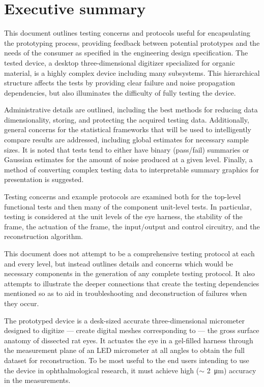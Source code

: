\documentclass{article}
\begin{document}

\setcounter{tocdepth}{3}
\tableofcontents
\newpage

\section*{Executive summary}
\label{sec:exec-summary}

This document outlines testing concerns and protocols useful for encapsulating the prototyping process, providing feedback between potential prototypes and the needs of the consumer as specified in the engineering design specification. The tested device, a desktop three-dimensional digitizer specialized for organic material, is a highly complex device including many subsystems. This hierarchical structure affects the tests by providing clear failure and noise propagation dependencies, but also illuminates the difficulty of fully testing the device.

Administrative details are outlined, including the best methods for reducing data dimensionality, storing, and protecting the acquired testing data. Additionally, general concerns for the statistical frameworks that will be used to intelligently compare results are addressed, including global estimates for necessary sample sizes. It is noted that tests tend to either have binary (pass/fail) summaries or Gaussian estimates for the amount of noise produced at a given level. Finally, a method of converting complex testing data to interpretable summary graphics for presentation is suggested.

Testing concerns and example protocols are examined both for the top-level functional tests and then many of the component unit-level tests. In particular, testing is considered at the unit levels of the eye harness, the stability of the frame, the actuation of the frame, the input/output and control circuitry, and the reconstruction algorithm.

This document does not attempt to be a comprehensive testing protocol at each and every level, but instead outlines details and concerns which would be necessary components in the generation of any complete testing protocol. It also attempts to illustrate the deeper connections that create the testing dependencies mentioned so as to aid in troubleshooting and deconstruction of failures when they occur.

\newpage

The prototyped device is a desk-sized accurate three-dimensional micrometer designed to digitize --- create digital meshes corresponding to --- the gross surface anatomy of dissected rat eyes. It actuates the eye in a gel-filled harness through the measurement plane of an LED micrometer at all angles to obtain the full dataset for reconstruction. To be most useful to the end users intending to use the device in ophthalmological research, it must achieve high ($\sim$ \SI{2}{\micro m}) accuracy in the measurements.
\end{document}
